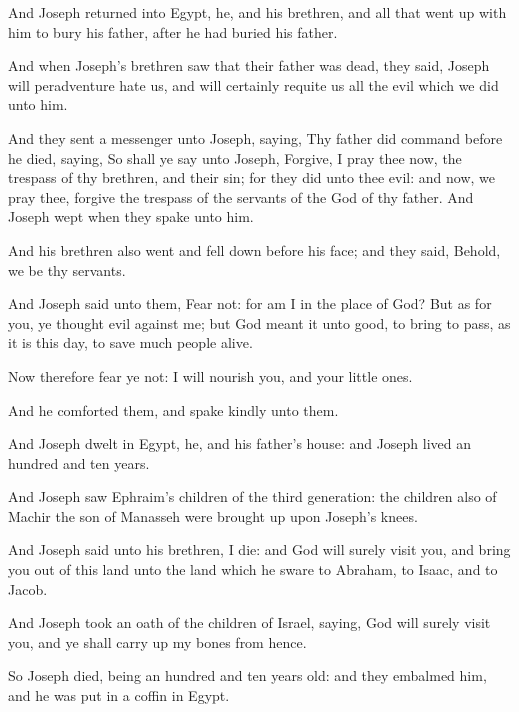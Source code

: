 \verse And Joseph returned into Egypt, he, and his brethren, and all that went up with him to bury his father, after he had buried his father.

\verse And when Joseph's brethren saw that their father was dead, they said, Joseph will peradventure hate us, and will certainly requite us all the evil which we did unto him.

\verse And they sent a messenger unto Joseph, saying, Thy father did command before he died, saying, \verse So shall ye say unto Joseph, Forgive, I pray thee now, the trespass of thy brethren, and their sin; for they did unto thee evil: and now, we pray thee, forgive the trespass of the servants of the God of thy father. And Joseph wept when they spake unto him.

\verse And his brethren also went and fell down before his face; and they said, Behold, we be thy servants.

\verse And Joseph said unto them, Fear not: for am I in the place of God?  \verse But as for you, ye thought evil against me; but God meant it unto good, to bring to pass, as it is this day, to save much people alive.

\verse Now therefore fear ye not: I will nourish you, and your little ones.

And he comforted them, and spake kindly unto them.

\verse And Joseph dwelt in Egypt, he, and his father's house: and Joseph lived an hundred and ten years.

\verse And Joseph saw Ephraim's children of the third generation: the children also of Machir the son of Manasseh were brought up upon Joseph's knees.

\verse And Joseph said unto his brethren, I die: and God will surely visit you, and bring you out of this land unto the land which he sware to Abraham, to Isaac, and to Jacob.

\verse And Joseph took an oath of the children of Israel, saying, God will surely visit you, and ye shall carry up my bones from hence.

\verse So Joseph died, being an hundred and ten years old: and they embalmed him, and he was put in a coffin in Egypt.

